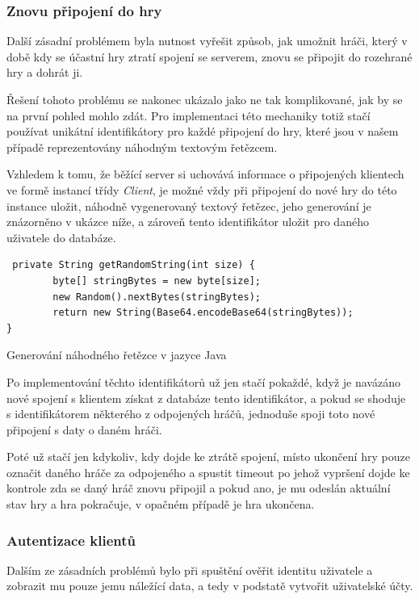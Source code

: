 \documentclass[12pt]{article}
\begin{document}
\subsubsection{Znovu připojení do hry}
Další zásadní problémem byla nutnost vyřešit způsob, jak umožnit hráči, který v době kdy se účastní hry ztratí spojení se serverem, znovu se připojit do rozehrané hry a dohrát ji.

Řešení tohoto problému se nakonec ukázalo jako ne tak komplikované, jak by se na první pohled mohlo zdát. Pro implementaci této mechaniky totiž stačí používat unikátní identifikátory pro každé připojení do hry, které jsou v našem případě reprezentovány náhodným textovým řetězcem.

Vzhledem k tomu, že běžící server si uchovává informace o připojených klientech ve formě instancí třídy \textit{Client}, je možné vždy při připojení do nové hry do této instance uložit, náhodně vygenerovaný textový řetězec, jeho generování je znázorněno v ukázce níže, a zároveň tento identifikátor uložit pro daného uživatele do databáze.

\begin{listing}[!ht]
\begin{verbatim}
 private String getRandomString(int size) {
        byte[] stringBytes = new byte[size];
        new Random().nextBytes(stringBytes);
        return new String(Base64.encodeBase64(stringBytes));
}
\end{verbatim}
\caption{Generování náhodného řetězce v jazyce Java}
\end{listing}

Po implementování těchto identifikátorů už jen stačí pokaždé, když je navázáno nové spojení s klientem získat z databáze tento identifikátor, a pokud se shoduje s identifikátorem některého z odpojených hráčů, jednoduše spoji toto nové připojení s daty o daném hráči.

Poté už stačí jen kdykoliv, kdy dojde ke ztrátě spojení, místo ukončení hry pouze označit daného hráče za odpojeného a spustit timeout po jehož vypršení dojde ke kontrole zda se daný hráč znovu připojil a pokud ano, je mu odeslán aktuální stav hry a hra pokračuje, v opačném případě je hra ukončena.
\subsubsection{Autentizace klientů}
Dalším ze zásadních problémů bylo při spuštění ověřit identitu uživatele a zobrazit mu pouze jemu náležící data, a tedy v podstatě vytvořit uživatelské účty.
\end{document}
